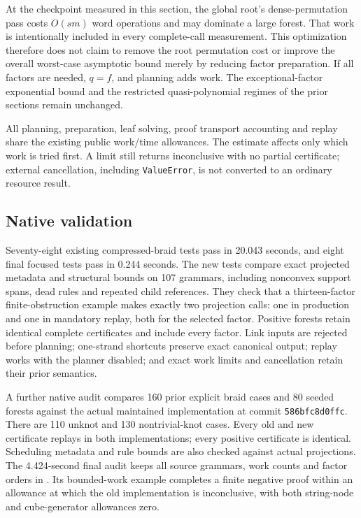 At the checkpoint measured in this section, the global root's dense-permutation pass costs $O(sm)$ word operations and may dominate a large forest. That work is intentionally
included in every complete-call measurement. This optimization therefore
does not claim to remove the root permutation cost or improve the overall
worst-case asymptotic bound merely by reducing factor preparation. If all
factors are needed, $q=f$, and planning adds work. The exceptional-factor
exponential bound and the restricted quasi-polynomial regimes of the prior
sections remain unchanged.

All planning, preparation, leaf solving, proof transport accounting and
replay share the existing public work/time allowances. The estimate affects
only which work is tried first. A limit still returns inconclusive with no
partial certificate; external cancellation, including \texttt{ValueError},
is not converted to an ordinary resource result.

\subsection{Native validation}

Seventy-eight existing compressed-braid tests pass in 20.043 seconds, and
eight final focused tests pass in 0.244 seconds. The new tests compare exact
projected metadata and structural bounds on 107 grammars, including nonconvex support spans, dead
rules and repeated child references. They check that a thirteen-factor
finite-obstruction example makes exactly two projection calls: one in
production and one in mandatory replay, both for the selected factor.
Positive forests retain identical complete certificates and include every
factor. Link inputs are rejected before planning; one-strand shortcuts
preserve exact canonical output; replay works with the planner disabled;
and exact work limits and cancellation retain their prior semantics.

A further native audit compares 160 prior explicit braid cases and 80
seeded forests against the actual maintained implementation at commit
\texttt{586bfc8d0ffc}. There are 110 unknot and 130 nontrivial-knot cases.
Every old and new certificate replays in both implementations; every
positive certificate is identical. Scheduling metadata and rule bounds
are also checked against actual projections. The 4.424-second final audit keeps
all source grammars, work counts and factor orders in
. Its bounded-work example completes a
finite negative proof within an allowance at which the old implementation
is inconclusive, with both string-node and cube-generator allowances zero.

